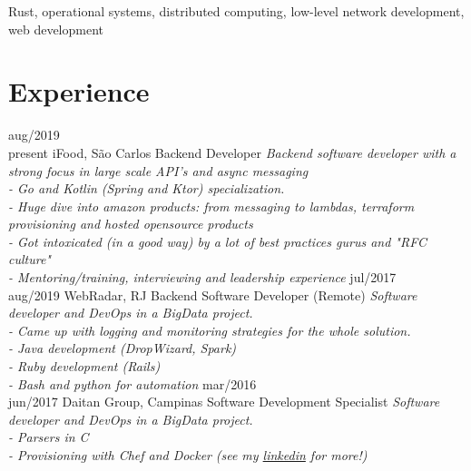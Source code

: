 \documentclass[]{friggeri-cv}
\begin{document}
Rust, operational systems, distributed computing, low-level network development, web development

\section{Experience}

\begin{entrylist}
  \entry
    {aug/2019\\present}
    {iFood, São Carlos}
    {Backend Developer}
    {\emph{Backend software developer with a strong focus in large scale API's and async messaging
\\
	- Go and Kotlin (Spring and Ktor) specialization.\\
    - Huge dive into amazon products: from messaging to lambdas, terraform provisioning and hosted opensource products\\
    - Got intoxicated (in a good way) by a lot of best practices gurus and "RFC culture"\\
    - Mentoring/training, interviewing and leadership experience}}
  \entry
    {jul/2017\\aug/2019}
    {WebRadar, RJ}
    {Backend Software Developer (Remote)}
    {\emph{Software developer and DevOps in a BigData project.\\
	- Came up with logging and monitoring strategies for the whole solution.\\
    - Java development (DropWizard, Spark)\\
    - Ruby development (Rails)\\
    - Bash and python for automation}}
  \entry
    {mar/2016\\jun/2017}
    {Daitan Group, Campinas}
    {Software Development Specialist}
    {\emph{Software developer and DevOps in a BigData project.\\
    - Parsers in C\\
    - Provisioning with Chef and Docker}}
  \entry
	{}
	{}
	{}
	{\emph{(see my \href{https://www.linkedin.com/in/raul-cioldin/}{linkedin} for more!)}}
\end{entrylist}
\end{document}
